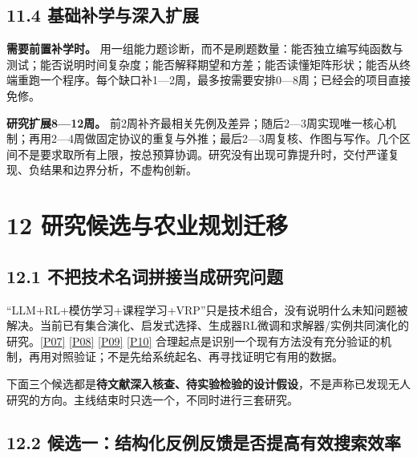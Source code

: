 \subsection{11.4
基础补学与深入扩展}\label{ux57faux7840ux8865ux5b66ux4e0eux6df1ux5165ux6269ux5c55}

\textbf{需要前置补学时。}
用一组能力题诊断，而不是刷题数量：能否独立编写纯函数与测试；能否说明时间复杂度；能否解释期望和方差；能否读懂矩阵形状；能否从终端重跑一个程序。每个缺口补1---2周，最多按需要安排0---8周；已经会的项目直接免修。

\textbf{研究扩展8---12周。}
前2周补齐最相关先例及差异；随后2---3周实现唯一核心机制；再用2---4周做固定协议的重复与外推；最后2---3周复核、作图与写作。几个区间不是要求取所有上限，按总预算协调。研究没有出现可靠提升时，交付严谨复现、负结果和边界分析，不虚构创新。

\section{12
研究候选与农业规划迁移}\label{ux7814ux7a76ux5019ux9009ux4e0eux519cux4e1aux89c4ux5212ux8fc1ux79fb}

\subsection{12.1
不把技术名词拼接当成研究问题}\label{ux4e0dux628aux6280ux672fux540dux8bcdux62fcux63a5ux5f53ux6210ux7814ux7a76ux95eeux9898}

``LLM+RL+模仿学习+课程学习+VRP''只是技术组合，没有说明什么未知问题被解决。当前已有集合演化、启发式选择、生成器RL微调和求解器/实例共同演化的研究。\href{https://ojs.aaai.org/index.php/AAAI/article/view/41038}{{[}P07{]}}
\href{https://arxiv.org/abs/2504.05108}{{[}P08{]}}
\href{https://arxiv.org/abs/2506.15196}{{[}P09{]}}
\href{https://arxiv.org/abs/2601.22896}{{[}P10{]}}
合理起点是识别一个现有方法没有充分验证的机制，再用对照验证；不是先给系统起名、再寻找证明它有用的数据。

下面三个候选都是\textbf{待文献深入核查、待实验检验的设计假设}，不是声称已发现无人研究的方向。主线结束时只选一个，不同时进行三套研究。

\subsection{12.2
候选一：结构化反例反馈是否提高有效搜索效率}\label{ux5019ux9009ux4e00ux7ed3ux6784ux5316ux53cdux4f8bux53cdux9988ux662fux5426ux63d0ux9ad8ux6709ux6548ux641cux7d22ux6548ux7387}

